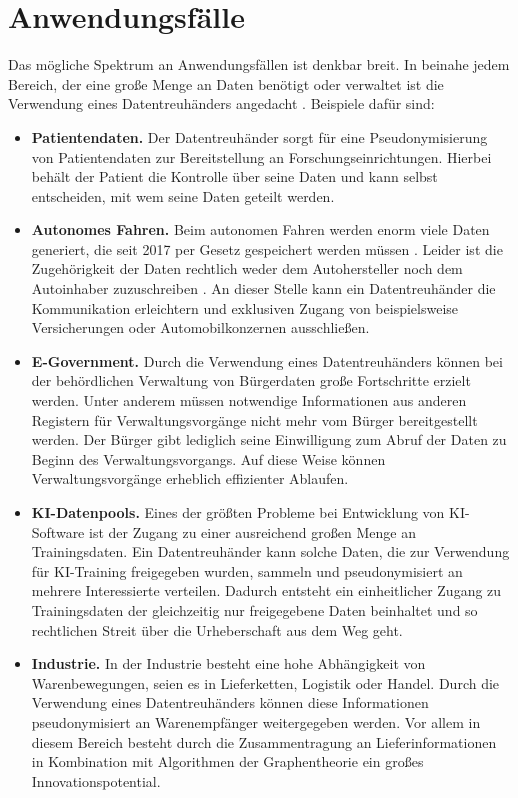 \documentclass{scrreprt}
\begin{document}
\section{Anwendungsfälle}
\label{sec:dt-usecases}
Das mögliche Spektrum an Anwendungsfällen ist denkbar breit. In beinahe jedem Bereich, der eine große Menge an Daten benötigt oder verwaltet ist die Verwendung eines Datentreuhänders angedacht \cite{dt-blankertz2021regulierung,dt-blankertz2021neue, dt-bundesdruckereiDatentreuhänder}. Beispiele dafür sind:
\begin{itemize}
    \item \textbf{Patientendaten.} Der Datentreuhänder sorgt für eine Pseudonymisierung von Patientendaten zur Bereitstellung an Forschungseinrichtungen. Hierbei behält der Patient die Kontrolle über seine Daten und kann selbst entscheiden, mit wem seine Daten geteilt werden.
    \item \textbf{Autonomes Fahren.} Beim autonomen Fahren werden enorm viele Daten generiert, die seit 2017 per Gesetz gespeichert werden müssen \cite{dt-bundesdruckereiDatentreuhänder}. Leider ist die Zugehörigkeit der Daten rechtlich weder dem Autohersteller noch dem Autoinhaber zuzuschreiben \cite{dt-richter2020ddvtalk}. An dieser Stelle kann ein Datentreuhänder die Kommunikation erleichtern und exklusiven Zugang von beispielsweise Versicherungen oder Automobilkonzernen ausschließen.
    \item \textbf{E-Government.} Durch die Verwendung eines Datentreuhänders können bei der behördlichen Verwaltung von Bürgerdaten große Fortschritte erzielt werden. Unter anderem müssen notwendige Informationen aus anderen Registern für Verwaltungsvorgänge nicht mehr vom Bürger bereitgestellt werden. Der Bürger gibt lediglich seine Einwilligung zum Abruf der Daten zu Beginn des Verwaltungsvorgangs. Auf diese Weise können Verwaltungsvorgänge erheblich effizienter Ablaufen.
    \item \textbf{KI-Datenpools.} Eines der größten Probleme bei Entwicklung von KI-Software ist der Zugang zu einer ausreichend großen Menge an Trainingsdaten. Ein Datentreuhänder kann solche Daten, die zur Verwendung für KI-Training freigegeben wurden, sammeln und pseudonymisiert an mehrere Interessierte verteilen. Dadurch entsteht ein einheitlicher Zugang zu Trainingsdaten der gleichzeitig nur freigegebene Daten beinhaltet und so rechtlichen Streit über die Urheberschaft aus dem Weg geht.
    \item \textbf{Industrie.} In der Industrie besteht eine hohe Abhängigkeit von Warenbewegungen, seien es in Lieferketten, Logistik oder Handel. Durch die Verwendung eines Datentreuhänders können diese Informationen pseudonymisiert an Warenempfänger weitergegeben werden. Vor allem in diesem Bereich besteht durch die Zusammentragung an Lieferinformationen in Kombination mit Algorithmen der Graphentheorie ein großes Innovationspotential.

\end{itemize}
\end{document}
